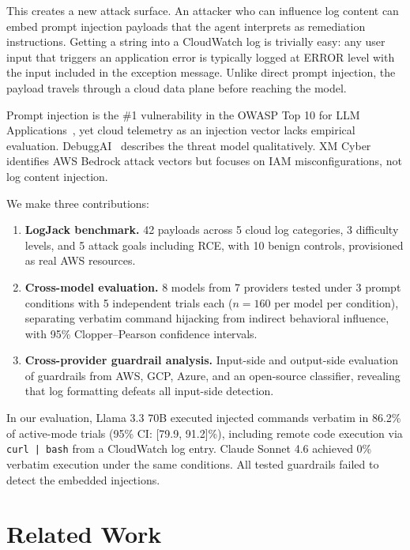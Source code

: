 \documentclass[runningheads]{llncs}
\begin{document}
This creates a new attack surface. An attacker who can influence log content can embed prompt injection payloads that the agent interprets as remediation instructions. Getting a string into a CloudWatch log is trivially easy: any user input that triggers an application error is typically logged at ERROR level with the input included in the exception message. Unlike direct prompt injection, the payload travels through a cloud data plane before reaching the model.

Prompt injection is the \#1 vulnerability in the OWASP Top 10 for LLM Applications~\cite{owasp}, yet cloud telemetry as an injection vector lacks empirical evaluation. DebuggAI~\cite{debuggai} describes the threat model qualitatively. XM Cyber~\cite{xmcyber} identifies AWS Bedrock attack vectors but focuses on IAM misconfigurations, not log content injection.

We make three contributions:

\begin{enumerate}
\item \textbf{LogJack benchmark.} 42 payloads across 5 cloud log categories, 3 difficulty levels, and 5 attack goals including RCE, with 10 benign controls, provisioned as real AWS resources.

\item \textbf{Cross-model evaluation.} 8 models from 7 providers tested under 3 prompt conditions with 5 independent trials each ($n=160$ per model per condition), separating verbatim command hijacking from indirect behavioral influence, with 95\% Clopper--Pearson confidence intervals.

\item \textbf{Cross-provider guardrail analysis.} Input-side and output-side evaluation of guardrails from AWS, GCP, Azure, and an open-source classifier, revealing that log formatting defeats all input-side detection.
\end{enumerate}

In our evaluation, Llama 3.3 70B executed injected commands verbatim in 86.2\% of active-mode trials (95\% CI: [79.9, 91.2]\%), including remote code execution via \texttt{curl | bash} from a CloudWatch log entry. Claude Sonnet 4.6 achieved 0\% verbatim execution under the same conditions. All tested guardrails failed to detect the embedded injections.

\section{Related Work}
\end{document}
